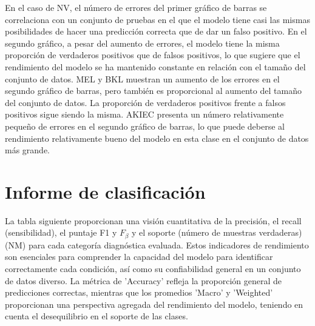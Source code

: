 En el caso de NV, el número de errores del primer gráfico de barras se correlaciona con un conjunto de pruebas en el que el modelo tiene casi las mismas posibilidades de hacer una predicción correcta que de dar un falso positivo. En el segundo gráfico, a pesar del aumento de errores, el modelo tiene la misma proporción de verdaderos positivos que de falsos positivos, lo que sugiere que el rendimiento del modelo se ha mantenido constante en relación con el tamaño del conjunto de datos. MEL y BKL muestran un aumento de los errores en el segundo gráfico de barras, pero también es proporcional al aumento del tamaño del conjunto de datos. La proporción de verdaderos positivos frente a falsos positivos sigue siendo la misma.
AKIEC presenta un número relativamente pequeño de errores en el segundo gráfico de barras, lo que puede deberse al rendimiento relativamente bueno del modelo en esta clase en el conjunto de datos más grande.

\section*{Informe de clasificación}

La tabla siguiente proporcionan una visión cuantitativa de la precisión, el recall (sensibilidad), el puntaje F1 y $F_{\beta}$ y el soporte (número de muestras verdaderas) (NM) para cada categoría diagnóstica evaluada. Estos indicadores de rendimiento son esenciales para comprender la capacidad del modelo para identificar correctamente cada condición, así como su confiabilidad general en un conjunto de datos diverso. La métrica de 'Accuracy' refleja la proporción general de predicciones correctas, mientras que los promedios 'Macro' y 'Weighted' proporcionan una perspectiva agregada del rendimiento del modelo, teniendo en cuenta el desequilibrio en el soporte de las clases. 

